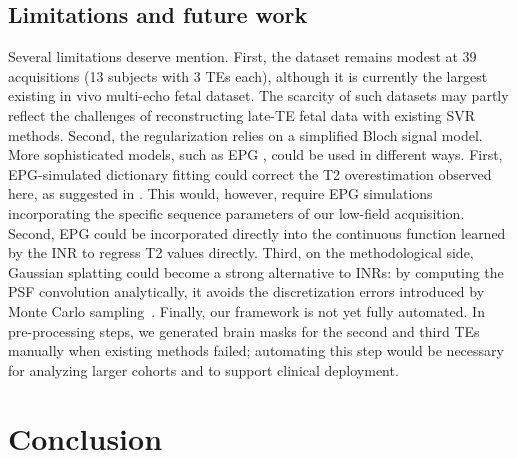 \documentclass[preprint,authoryear,12pt]{elsarticle}
\begin{document}
\subsection{Limitations and future work}

Several limitations deserve mention. First, the dataset remains modest at 39 acquisitions (13 subjects with 3 TEs each), although it is currently the largest existing in vivo multi-echo fetal dataset. The scarcity of such datasets may partly reflect the challenges of reconstructing late-TE fetal data with existing SVR methods. Second, the regularization relies on a simplified Bloch signal model. More sophisticated models, such as EPG \citep{weigel_extended_2015}, could be used in different ways. First, EPG-simulated dictionary fitting could correct the T2 overestimation observed here, as suggested in \cite{bhattacharya_vivo_2024}. This would, however, require EPG simulations incorporating the specific sequence parameters of our low-field acquisition. Second, EPG could be incorporated directly into the continuous function learned by the INR to regress T2 values directly. Third, on the methodological side, Gaussian splatting could become a strong alternative to INRs: by computing the PSF convolution analytically, it avoids the discretization errors introduced by Monte Carlo sampling~\citep{dannecker2026fast}.
Finally, our framework is not yet fully automated. In pre-processing steps, we generated brain masks for the second and third TEs manually when existing methods failed; automating this step would be necessary for analyzing larger cohorts and to support clinical deployment.


\section{Conclusion}
\end{document}
